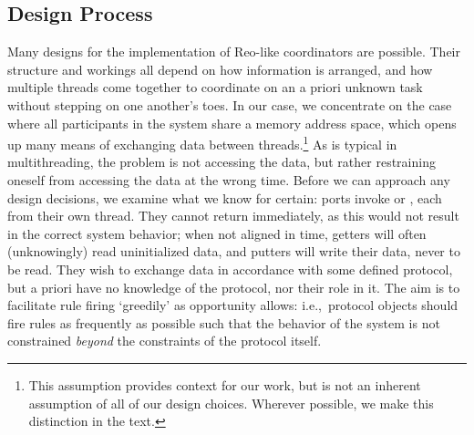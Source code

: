 \subsection{Design Process}
\label{sec:chosen_design}
Many designs for the implementation of Reo-like coordinators are possible. Their structure and workings all depend on how information is arranged, and how multiple threads come together to coordinate on an a priori unknown task without stepping on one another's toes. In our case, we concentrate on the case where all participants in the system share a memory address space, which opens up many means of exchanging data between threads.\footnote{This assumption provides context for our work, but is not an inherent assumption of all of our design choices. Wherever possible, we make this distinction in the text.} As is typical in multithreading, the problem is not accessing the data, but rather restraining oneself from accessing the data at the wrong time. Before we can approach any design decisions, we examine what we know for certain: ports invoke  or , each from their own thread. They cannot return immediately, as this would not result in the correct system behavior; when not aligned in time, getters will often (unknowingly) read uninitialized data, and putters will write their data, never to be read. They wish to exchange data in accordance with some defined protocol, but a priori have no knowledge of the protocol, nor their role in it. The aim is to facilitate rule firing `greedily' as opportunity allows: i.e.,\ protocol objects should fire rules as frequently as possible such that the behavior of the system is not constrained \textit{beyond} the constraints of the protocol itself.


